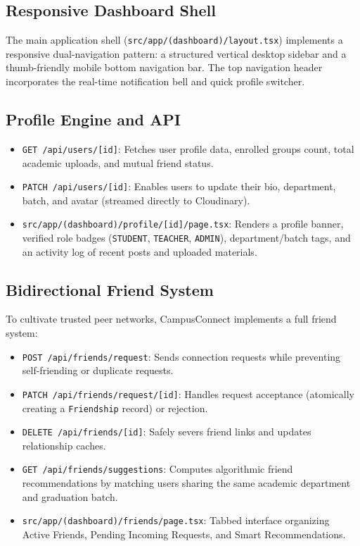 \documentclass[12pt, a4paper, oneside]{report}
\begin{document}
\subsection{Responsive Dashboard Shell}
The main application shell (\texttt{src/app/(dashboard)/layout.tsx}) implements a responsive dual-navigation pattern: a structured vertical desktop sidebar and a thumb-friendly mobile bottom navigation bar. The top navigation header incorporates the real-time notification bell and quick profile switcher.

\subsection{Profile Engine and API}
\begin{itemize}[leftmargin=0.7cm]
    \item \texttt{GET /api/users/[id]}: Fetches user profile data, enrolled groups count, total academic uploads, and mutual friend status.
    \item \texttt{PATCH /api/users/[id]}: Enables users to update their bio, department, batch, and avatar (streamed directly to Cloudinary).
    \item \texttt{src/app/(dashboard)/profile/[id]/page.tsx}: Renders a profile banner, verified role badges (\texttt{STUDENT}, \texttt{TEACHER}, \texttt{ADMIN}), department/batch tags, and an activity log of recent posts and uploaded materials.
\end{itemize}

\subsection{Bidirectional Friend System}
To cultivate trusted peer networks, CampusConnect implements a full friend system:
\begin{itemize}[leftmargin=0.7cm]
    \item \texttt{POST /api/friends/request}: Sends connection requests while preventing self-friending or duplicate requests.
    \item \texttt{PATCH /api/friends/request/[id]}: Handles request acceptance (atomically creating a \texttt{Friendship} record) or rejection.
    \item \texttt{DELETE /api/friends/[id]}: Safely severs friend links and updates relationship caches.
    \item \texttt{GET /api/friends/suggestions}: Computes algorithmic friend recommendations by matching users sharing the same academic department and graduation batch.
    \item \texttt{src/app/(dashboard)/friends/page.tsx}: Tabbed interface organizing Active Friends, Pending Incoming Requests, and Smart Recommendations.
\end{itemize}
\end{document}

